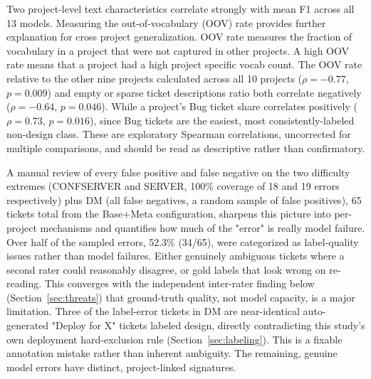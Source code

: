 \documentclass[preprint,12pt]{elsarticle}
\begin{document}
Two project-level text characteristics correlate strongly with mean F1 across all 13 models. Measuring the out-of-vocabulary (OOV) rate provides further explanation for cross project generalization. OOV rate measures the fraction of vocabulary in a project that were not captured in other projects. A high OOV rate means that a project had a high project specific vocab count. The OOV rate relative to the other nine projects calculated across all 10 projects ($\rho=-0.77$, $p=0.009$) and empty or sparse ticket descriptions ratio both correlate negatively ($\rho=-0.64$, $p=0.046$). While a project's Bug ticket share correlates positively ($\rho=0.73$, $p=0.016$), since Bug tickets are the easiest, most consistently-labeled non-design class. These are exploratory Spearman correlations, uncorrected for multiple comparisons, and should be read as descriptive rather than confirmatory.

A manual review of every false positive and false negative on the two difficulty extremes (CONFSERVER and SERVER, 100\% coverage of 18 and 19 errors respectively) plus DM (all false negatives, a random sample of false positives), 65 tickets total from the Base+Meta configuration, sharpens this picture into per-project mechanisms and quantifies how much of the "error" is really model failure. Over half of the sampled errors, 52.3\% (34/65), were categorized as label-quality issues rather than model failures. Either genuinely ambiguous tickets where a second rater could reasonably disagree, or gold labels that look wrong on re-reading. This converges with the independent inter-rater finding below (Section~\ref{sec:threats}) that ground-truth quality, not model capacity, is a major limitation. Three of the label-error tickets in DM are near-identical auto-generated "Deploy for X" tickets labeled design, directly contradicting this study's own deployment hard-exclusion rule (Section~\ref{sec:labeling}). This is a fixable annotation mistake rather than inherent ambiguity. The remaining, genuine model errors have distinct, project-linked signatures. 
\end{document}

